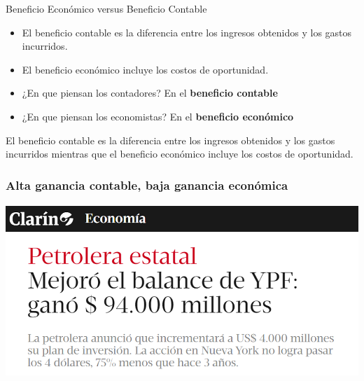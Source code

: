 \documentclass{beamer}
\begin{document}
\begin{frame}{Beneficio Económico versus Beneficio Contable}
    \begin{itemize}
        \item El beneficio contable es la diferencia entre los ingresos obtenidos y los gastos incurridos.
        \item El beneficio económico incluye los costos de oportunidad.
        \item ¿En que piensan los contadores? En el \textbf{beneficio contable}
        \item ¿En que piensan los economistas? En el \textbf{beneficio económico}
    \end{itemize}

    \begin{boxA}
        \begin{center}
            El beneficio contable es la diferencia entre los ingresos obtenidos y los gastos incurridos mientras que el beneficio económico incluye los costos de oportunidad.
        \end{center}
    \end{boxA}
\end{frame}

\begin{frame}
    \frametitle{Alta ganancia contable, baja ganancia económica}
    \centering
    \includegraphics[scale=0.5]{../Figures/YPF.png}
\end{frame}
\end{document}

